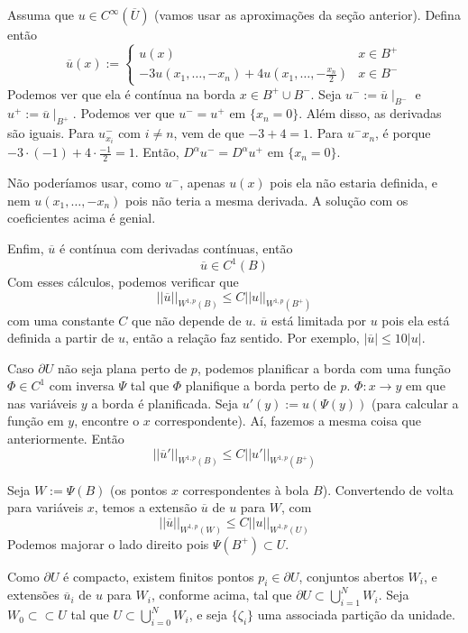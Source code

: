 \documentclass[a4paper, 11pt]{article}
\newcommand{\pu}{\partial U}
\begin{document}
Assuma que \( u \in C^\infty (\overline{U}) \) (vamos usar as aproximações da seção anterior). Defina então \[ \overline{u}(x) := \begin{cases}
	u(x) & x \in B^+ \\
	-3u(x_1, \ldots, -x_n) + 4u(x_1, \ldots, -\frac{x_n}{2}) & x \in B^-
\end{cases} \] Podemos ver que ela é contínua na borda \( x \in B^+ \cup B^- \). Seja \( u^- := \overline{u}\mid_{B^-} \) e \( u^+ := \overline{u}\mid_{B^+} \).  Podemos ver que \( u^- = u^+ \) em \( \{x_n=0\}\). Além disso, as derivadas são iguais. Para \( u^-_{x_i} \) com \( i \neq n \), vem de que \( -3 + 4 = 1 \). Para \( u^-{x_n} \), é porque \( -3 \cdot (-1) + 4 \cdot \frac{-1}{2} = 1 \). Então, \( D^\alpha u^- = D^\alpha u^+ \) em \( \{x_n=0\} \).

Não poderíamos usar, como $ u^- $, apenas $ u(x) $ pois ela não estaria definida, e nem $ u(x_1,\ldots, -x_n) $ pois não teria a mesma derivada. A solução com os coeficientes acima é genial.


Enfim, $ \overline{u} $ é contínua com derivadas contínuas, então \[ \overline{u} \in C^1(B) \]
Com esses cálculos, podemos verificar que \[ ||\overline{u}||_{W^{1,p}(B)} \leq C ||u||_{W^{1,p}(B^+)} \] com uma constante \( C \) que não depende de \( u \). $\overline{u} $ está limitada por $u$ pois ela está definida a partir de $u$, então a relação faz sentido. Por exemplo, $|\overline{u}| \leq 10  |u| $.

Caso \( \pu \) não seja plana perto de \( p \), podemos planificar a borda com uma função \( \Phi \in C^1 \) com inversa \( \Psi \) tal que \( \Phi \) planifique a borda perto de \( p \).
\( \Phi: x \rightarrow y \) em que nas variáveis \( y \) a borda é planificada. Seja \( u'(y) := u(\Psi(y)) \) (para calcular a função em \( y \), encontre o \( x \) correspondente). Aí, fazemos a mesma coisa que anteriormente. Então \[ ||\overline{u}'||_{W^{1,p}(B)} \leq C ||u'||_{W^{1,p}(B^+)} \]

Seja \( W:= \Psi(B) \) (os pontos \( x \) correspondentes à bola \( B \)). Convertendo de volta para variáveis \( x \), temos a extensão \( \overline{u} \) de \( u \) para \( W \), com \[ ||\overline{u}||_{W^{1,p}(W)} \leq C ||u||_{W^{1,p}(U)} \] Podemos majorar o lado direito pois \( \Psi(B^+) \subset  U  \).

Como \( \pu \) é compacto, existem finitos pontos \( p_i \in \pu \), conjuntos abertos \( W_i \), e extensões \( \overline{u}_i \) de \( u \) para \( W_i \), conforme acima, tal que \( \pu \subset \bigcup_{i=1}^N W_i \). Seja \( W_0 \subset\subset U \) tal que \( U \subset \bigcup_{i=0}^N W_i \), e seja \( \{ \zeta_i \} \) uma associada partição da unidade.
\end{document}
